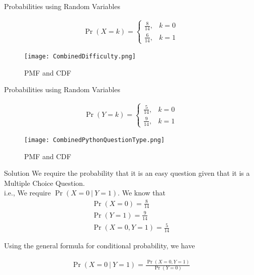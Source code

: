 \documentclass{beamer}
\providecommand{\pr}[1]{\ensuremath{\Pr\left(#1\right)}}
\numberwithin{equation}{subsection}
\begin{document}
\begin{frame}{Probabilities using Random Variables}

    \begin{align}
    \pr{X = k} = 
      \begin{cases}
      \frac{8}{14}, & k = 0 \\
      \frac{6}{14}, & k = 1 
      \end{cases}
    \end{align}

\begin{figure}[!ht]
       \centering
       \texttt{[image: CombinedDifficulty.png]}
       \caption{PMF and CDF}
       \label{fig:Question Difficulty}
\end{figure}

\end{frame}

\begin{frame}{Probabilities using Random Variables}

\begin{align}
    \pr{Y = k} = 
      \begin{cases}
      \frac{5}{14}, & k = 0 \\
      \frac{9}{14}, & k = 1 
      \end{cases}
\end{align}

\begin{figure}[!ht]
       \centering
       \texttt{[image: CombinedPythonQuestionType.png]}
       \caption{PMF and CDF}
       \label{fig:Question Difficulty}
\end{figure}
\end{frame}

\begin{frame}{Solution}
   We require the probability that it is an easy question given that it is a Multiple Choice Question.\\
i.e., We require $\pr{X = 0\ |\ Y = 1}$. We know that
\begin{align}
    \pr{X = 0} = \frac{8}{14}\\
    \pr{Y = 1} = \frac{9}{14}\\
   \pr{X = 0, Y = 1} = \frac{5}{14}
\end{align}

\pagebreak

Using the general formula for conditional probability, we have 

\begin{align}
    &\pr{X = 0\ |\ Y = 1} = \frac{\pr{X = 0, Y = 1}}{\pr{Y = 0}}&
\end{align}
\end{frame}
\end{document}
